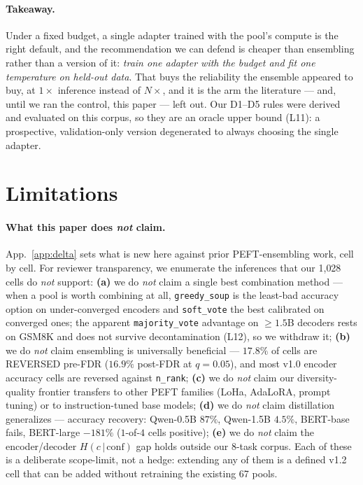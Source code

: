 \documentclass[11pt]{article}
\begin{document}
\paragraph{Takeaway.} Under a fixed budget, a single adapter trained with the pool's compute is the right default, and the recommendation we can defend is cheaper than ensembling rather than a version of it: \emph{train one adapter with the budget and fit one temperature on held-out data}. That buys the reliability the ensemble appeared to buy, at $1\times$ inference instead of $N\times$, and it is the arm the literature --- and, until we ran the control, this paper --- left out. Our D1--D5 rules were derived and evaluated on this corpus, so they are an oracle upper bound (L11): a prospective, validation-only version degenerated to always choosing the single adapter.

\FloatBarrier
\section*{Limitations}

\paragraph{What this paper does \emph{not} claim.} App.~\ref{app:delta} sets what is new here against prior PEFT-ensembling work, cell by cell. For reviewer transparency, we enumerate the inferences that our 1{,}028 cells do \emph{not} support: \textbf{(a)} we do \emph{not} claim a single best combination method --- when a pool is worth combining at all, \texttt{greedy\_soup} is the least-bad accuracy option on under-converged encoders and \texttt{soft\_vote} the best calibrated on converged ones; the apparent \texttt{majority\_vote} advantage on $\geq 1.5$B decoders rests on GSM8K and does not survive decontamination (L12), so we withdraw it; \textbf{(b)} we do \emph{not} claim ensembling is universally beneficial --- $17.8\%$ of cells are REVERSED pre-FDR ($16.9\%$ post-FDR at $q{=}0.05$), and most v1.0 encoder accuracy cells are reversed against \texttt{n\_rank}; \textbf{(c)} we do \emph{not} claim our diversity-quality frontier transfers to other PEFT families (LoHa, AdaLoRA, prompt tuning) or to instruction-tuned base models; \textbf{(d)} we do \emph{not} claim distillation generalizes --- accuracy recovery: Qwen-0.5B $87\%$, Qwen-1.5B $4.5\%$, BERT-base fails, BERT-large $-181\%$ ($1$-of-$4$ cells positive); \textbf{(e)} we do \emph{not} claim the encoder/decoder $H(c\,|\,\mathrm{conf})$ gap holds outside our 8-task corpus. Each of these is a deliberate scope-limit, not a hedge: extending any of them is a defined v1.2 cell that can be added without retraining the existing 67 pools.
\end{document}
